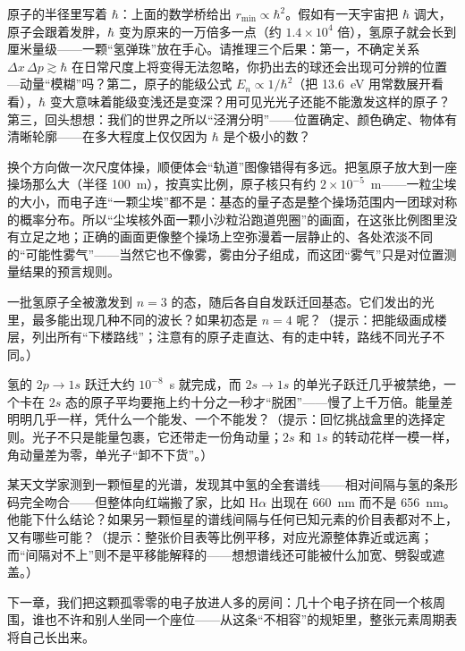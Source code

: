 \begin{thought}[如果普朗克常数大一万倍]
原子的半径里写着 \(\hbar\)：上面的数学桥给出 \(r_{\min}\propto\hbar^2\)。假如有一天宇宙把 \(\hbar\) 调大，原子会跟着发胖，\(\hbar\) 变为原来的一万倍多一点（约 \(1.4\times10^4\) 倍），氢原子就会长到厘米量级——一颗“氢弹珠”放在手心。请推理三个后果：第一，不确定关系 \(\Delta x\,\Delta p\gtrsim\hbar\) 在日常尺度上将变得无法忽略，你扔出去的球还会出现可分辨的位置—动量“模糊”吗？第二，原子的能级公式 \(E_n\propto 1/\hbar^2\)（把 13.6~eV 用常数展开看看），\(\hbar\) 变大意味着能级变浅还是变深？用可见光光子还能不能激发这样的原子？第三，回头想想：我们的世界之所以“泾渭分明”——位置确定、颜色确定、物体有清晰轮廓——在多大程度上仅仅因为 \(\hbar\) 是个极小的数？
\end{thought}

换个方向做一次尺度体操，顺便体会“轨道”图像错得有多远。把氢原子放大到一座操场那么大（半径 100~m），按真实比例，原子核只有约 \(2\times10^{-5}\)~m——一粒尘埃的大小，而电子连“一颗尘埃”都不是：基态的量子态是整个操场范围内一团球对称的概率分布。所以“尘埃核外面一颗小沙粒沿跑道兜圈”的画面，在这张比例图里没有立足之地；正确的画面更像整个操场上空弥漫着一层静止的、各处浓淡不同的“可能性雾气”——当然它也不像雾，雾由分子组成，而这团“雾气”只是对位置测量结果的预言规则。

\begin{puzzles}
\item 一批氢原子全被激发到 \(n=3\) 的态，随后各自自发跃迁回基态。它们发出的光里，最多能出现几种不同的波长？如果初态是 \(n=4\) 呢？（提示：把能级画成楼层，列出所有“下楼路线”；注意有的原子走直达、有的走中转，路线不同光子不同。）
\item 氢的 \(2p\to1s\) 跃迁大约 \(10^{-8}\)~s 就完成，而 \(2s\to1s\) 的单光子跃迁几乎被禁绝，一个卡在 \(2s\) 态的原子平均要拖上约十分之一秒才“脱困”——慢了上千万倍。能量差明明几乎一样，凭什么一个能发、一个不能发？（提示：回忆挑战盒里的选择定则。光子不只是能量包裹，它还带走一份角动量；\(2s\) 和 \(1s\) 的转动花样一模一样，角动量差为零，单光子“卸不下货”。）
\item 某天文学家测到一颗恒星的光谱，发现其中氢的全套谱线——相对间隔与氢的条形码完全吻合——但整体向红端搬了家，比如 H\(\alpha\) 出现在 660~nm 而不是 656~nm。他能下什么结论？如果另一颗恒星的谱线间隔与任何已知元素的价目表都对不上，又有哪些可能？（提示：整张价目表等比例平移，对应光源整体靠近或远离；而“间隔对不上”则不是平移能解释的——想想谱线还可能被什么加宽、劈裂或遮盖。）
\end{puzzles}

下一章，我们把这颗孤零零的电子放进人多的房间：几十个电子挤在同一个核周围，谁也不许和别人坐同一个座位——从这条“不相容”的规矩里，整张元素周期表将自己长出来。
